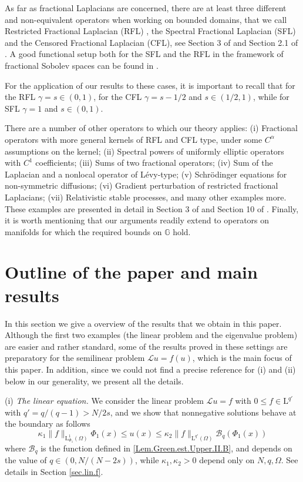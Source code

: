 \documentclass[11pt]{article}
\numberwithin{equation}{section}
\def\LL{\mathrm{L}} %
\newcommand{\A}{\mathcal{L}}
\newcommand{\K}{{\mathbb G}}
\newcommand{\B}{\mathcal{B}}
\begin{document}
As far as fractional Laplacians are concerned, there are at least three different and non-equivalent operators when working on bounded domains, that we  call Restricted Fractional Laplacian (RFL) , the Spectral Fractional Laplacian (SFL) and the Censored Fractional Laplacian (CFL), see Section 3 of \cite{BV-PPR2-1} and Section 2.1 of \cite{BFV-Parabolic}. A good functional setup both for the SFL and the RFL in the framework of fractional Sobolev spaces can be found in \cite{BSV2013}.

For the application  of our results to these cases, it is important to recall that for the RFL $\gamma=s\in (0,1)$, for the CFL $\gamma=s-1/2$ and $s\in (1/2,1)$, while for SFL $\gamma=1$ and $s\in (0,1)$.
%

There are a number of other operators to which our theory applies: (i) Fractional operators with more general kernels of RFL and CFL type, under some $C^\alpha$ assumptions on the kernel; (ii) Spectral powers of uniformly elliptic operators with $C^1$ coefficients; (iii) Sums of two fractional operators; (iv) Sum of the Laplacian   and a nonlocal operator of L\'evy-type;   (v) Schr\"odinger equations for non-symmetric diffusions; (vi) Gradient perturbation of restricted fractional Laplacians; (vii) Relativistic stable processes, and many other examples more. These examples are presented in detail in Section 3 of \cite{BV-PPR2-1} and Section 10 of \cite{BFV-Parabolic}. Finally, it is worth mentioning that our arguments readily extend to operators on manifolds for which the required bounds on $\K$ hold.

\section{\bf Outline of the paper and main results}\label{sec.MainRes}

In this section we give a overview of the results that we obtain in this paper. Although the first two examples (the linear problem and the eigenvalue problem) are easier and rather standard, some of the results proved in these settings are preparatory for the semilinear problem $\A u=f(u)$, which is the main focus of this paper. In addition, since we could not find a precise reference for (i) and (ii) below in our generality, we present all the details.



\noindent (i) \textit{The linear equation. }We consider the linear problem $\A u=f$ with $0\le f\in \LL^{q'}$ with   $q'=q/(q-1)>N/2s$,   and we show that nonnegative solutions behave at the boundary as follows
\begin{equation}\label{1.4}
\kappa_1\|f\|_{\LL^1_{\Phi_1}(\Omega)} \Phi_1(x)\le  u(x)\le\kappa_2  \|f\|_{\LL^{q'}(\Omega)}\B_q(\Phi_1(x))
\end{equation}
where $\B_q$ is the function defined in \eqref{Lem.Green.est.Upper.II.B}, and depends on the value of $q\in (0, N/(N-2s))$, while $\kappa_1,\kappa_2>0$ depend only on $N,q,\Omega$. See details in Section \ref{sec.lin.f}.
\end{document}
